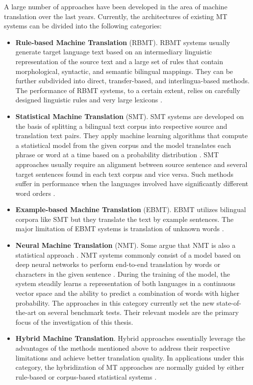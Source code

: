 A large number of approaches have been developed in the area of machine translation over the last years. Currently, the architectures of existing MT systems can be divided into the following categories: 
\medskip  
\begin{itemize}
\item \textbf{Rule-based Machine Translation} (RBMT). RBMT systems usually generate target language text based on an intermediary linguistic representation of the source text and a large set of rules that contain morphological, syntactic, and semantic bilingual mappings. They can be further subdivided into direct, transfer-based, and interlingua-based methods. The performance of RBMT systems, to a certain extent, relies on carefully designed linguistic rules and very large lexicons \cite{Moussallem2017}.
\item \textbf{Statistical Machine Translation} (SMT). SMT systems are developed on the basis of splitting a bilingual text corpus into respective source and translation text pairs. They apply machine learning algorithms that compute a statistical model from the given corpus and the model translates each phrase or word at a time based on a probability distribution \cite{Moussallem2017}. SMT approaches usually require an alignment between source sentence and several target sentences found in each text corpus and vice versa. Such methods suffer in performance when the languages involved have significantly different word orders \cite{okpor2014machine}.
\item \textbf{Example-based Machine Translation} (EBMT). EBMT utilizes bilingual corpora like SMT but they translate the text by example sentences. The major limitation of EBMT systems is translation of unknown words \cite{Moussallem2017}. 
\item \textbf{Neural Machine Translation} (NMT). Some argue that NMT is also a statistical approach \cite{Moussallem2017}. NMT systems commonly consist of a model based on deep neural networks to perform end-to-end translation by words or characters in the given sentence \cite{Moussallem2017}. During the training of the model, the system steadily learns a representation of both languages in a continuous vector space and the ability to predict a combination of words with higher probability. The approaches in this category currently set the new state-of-the-art on several benchmark tests. Their relevant models are the primary focus of the investigation of this thesis.
\item \textbf{Hybrid Machine Translation}. Hybrid approaches essentially leverage the advantages of the methods mentioned above to address their respective limitations and achieve better translation quality. In applications under this category, the hybridization of MT approaches are normally guided by either rule-based or corpus-based statistical systems \cite{costa2015latest}.
\end{itemize}

